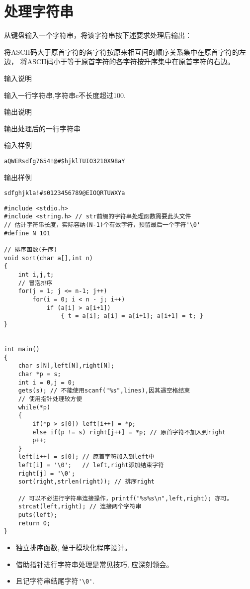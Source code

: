 \section{处理字符串}
从键盘输入一个字符串，将该字符串按下述要求处理后输出： 

将ASCII码大于原首字符的各字符按原来相互间的顺序关系集中在原首字符的左边，
将ASCII码小于等于原首字符的各字符按升序集中在原首字符的右边。

输入说明	

输入一行字符串,字符串c不长度超过100.

输出说明	

输出处理后的一行字符串

输入样例

\lstinline[mathescape=false]|aQWERsdfg7654!@#$hjklTUIO3210X98aY|

输出样例

\lstinline[mathescape=false]|sdfghjkla!#$0123456789@EIOQRTUWXYa|


\begin{lstlisting}
#include <stdio.h>
#include <string.h> // str前缀的字符串处理函数需要此头文件
// 估计字符串长度，实际容纳(N-1)个有效字符，预留最后一个字符'\0'  
#define N 101

// 排序函数(升序) 
void sort(char a[],int n)
{ 
	int i,j,t;
	// 冒泡排序
	for(j = 1; j <= n-1; j++) 
		for(i = 0; i < n - j; i++)
			if (a[i] > a[i+1]) 
				{ t = a[i]; a[i] = a[i+1]; a[i+1] = t; }
}


int main()
{
	char s[N],left[N],right[N];
	char *p = s;
	int i = 0,j = 0;
	gets(s); // 不能使用scanf("%s",lines),因其遇空格结束
	// 使用指针处理较方便 
	while(*p)
	{
		if(*p > s[0]) left[i++] = *p;
		else if(p != s) right[j++] = *p; // 原首字符不加入到right 
		p++; 
	}
	left[i++] = s[0]; // 原首字符加入到left中 
	left[i] = '\0';   // left,right添加结束字符 
	right[j] = '\0';
	sort(right,strlen(right)); // 排序right 
	
	// 可以不必进行字符串连接操作，printf("%s%s\n",left,right); 亦可。
	strcat(left,right); // 连接两个字符串 
	puts(left);
	return 0;
} 
\end{lstlisting}

\begin{note}[要点]
	\begin{itemize}
		\item 独立排序函数, 便于模块化程序设计。
		\item 借助指针进行字符串处理是常见技巧, 应深刻领会。
		\item 且记字符串结尾字符\lstinline|'\0'|.
	\end{itemize}
\end{note}

